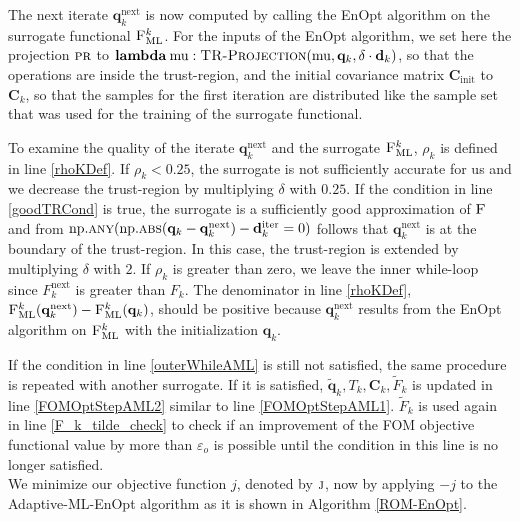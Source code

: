 The next iterate $\mathbf{q}^\mathrm{next}_k$ is now computed by calling the EnOpt algorithm on the surrogate functional $\textproc{F$_\mathrm{ML}^k$}$. For the inputs of the EnOpt algorithm, we set here the projection $\textproc{pr}$ to $\mathbf{lambda}\:\mathrm{mu}:\protect\Call{TR-Projection}{\mathrm{mu}, \mathbf{q}_k, \delta\cdot\mathbf{d}_k}$, so that the operations are inside the trust-region, and the initial covariance matrix $\mathbf{C}_\mathrm{init}$ to $\mathbf{C}_k$, so that the samples for the first iteration are distributed like the sample set that was used for the training of the surrogate functional.

To examine the quality of the iterate $\mathbf{q}^\mathrm{next}_k$ and the surrogate $\textproc{F$_\mathrm{ML}^k$}$, $\rho_k$ is defined in line \ref{rhoKDef}. If $\rho_k<0.25$, the surrogate is not sufficiently accurate for us and we decrease the trust-region by multiplying $\delta$ with $0.25$. If the condition in line \ref{goodTRCond} is true, the surrogate is a sufficiently good approximation of $\textproc{F}$ and from $\mathrm{np.}\Call{any}{\mathrm{np.}\protect\Call{abs}{\mathbf{q}_k-\mathbf{q}^\mathrm{next}_k}-\mathbf{d}^\mathrm{iter}_k = 0}$ follows that $\mathbf{q}^\mathrm{next}_k$ is at the boundary of the trust-region. In this case, the trust-region is extended by multiplying $\delta$ with $2$. If $\rho_k$ is greater than zero, we leave the inner while-loop since $F^\mathrm{next}_k$ is greater than $F_k$. The denominator in line \ref{rhoKDef}, $\Call{F$_\mathrm{ML}^k$}{\mathbf{q}^\mathrm{next}_k}-\Call{F$_\mathrm{ML}^k$}{\mathbf{q}_k}$, should be positive because $\mathbf{q}^\mathrm{next}_k$ results from the EnOpt algorithm on $\textproc{F$_\mathrm{ML}^k$}$ with the initialization $\mathbf{q}_k$.

If the condition in line \ref{outerWhileAML} is still not satisfied, the same procedure is repeated with another surrogate. If it is satisfied, $\tilde{\mathbf{q}}_k,T_k,\mathbf{C}_k,\tilde{F}_k$ is updated in line \ref{FOMOptStepAML2} similar to line \ref{FOMOptStepAML1}. $\tilde{F}_k$ is used again in line \ref{F_k_tilde_check} to check if an improvement of the FOM objective functional value by more than $\varepsilon_o$ is possible until the condition in this line is no longer satisfied.\\

We minimize our objective function $j$, denoted by $\textproc{j}$, now by applying $-j$ to the Adaptive-ML-EnOpt algorithm as it is shown in Algorithm \ref{ROM-EnOpt}.

